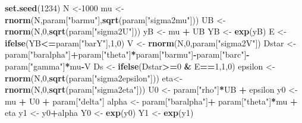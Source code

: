 \documentclass[]{book}
\newenvironment{Shaded}{\begin{snugshade}}{\end{snugshade}}
\newcommand{\DecValTok}[1]{\textcolor[rgb]{0.00,0.00,0.81}{#1}}
\newcommand{\KeywordTok}[1]{\textcolor[rgb]{0.13,0.29,0.53}{\textbf{#1}}}
\newcommand{\NormalTok}[1]{#1}
\newcommand{\OperatorTok}[1]{\textcolor[rgb]{0.81,0.36,0.00}{\textbf{#1}}}
\newcommand{\StringTok}[1]{\textcolor[rgb]{0.31,0.60,0.02}{#1}}
\theoremstyle{definition}
\theoremstyle{definition}
\theoremstyle{definition}
\theoremstyle{remark}
\begin{document}
\begin{Shaded}
\begin{Highlighting}[]
\KeywordTok{set.seed}\NormalTok{(}\DecValTok{1234}\NormalTok{)}
\NormalTok{N <-}\DecValTok{1000}
\NormalTok{mu <-}\StringTok{ }\KeywordTok{rnorm}\NormalTok{(N,param[}\StringTok{"barmu"}\NormalTok{],}\KeywordTok{sqrt}\NormalTok{(param[}\StringTok{"sigma2mu"}\NormalTok{]))}
\NormalTok{UB <-}\StringTok{ }\KeywordTok{rnorm}\NormalTok{(N,}\DecValTok{0}\NormalTok{,}\KeywordTok{sqrt}\NormalTok{(param[}\StringTok{"sigma2U"}\NormalTok{]))}
\NormalTok{yB <-}\StringTok{ }\NormalTok{mu }\OperatorTok{+}\StringTok{ }\NormalTok{UB }
\NormalTok{YB <-}\StringTok{ }\KeywordTok{exp}\NormalTok{(yB)}
\NormalTok{E <-}\StringTok{ }\KeywordTok{ifelse}\NormalTok{(YB}\OperatorTok{<=}\NormalTok{param[}\StringTok{"barY"}\NormalTok{],}\DecValTok{1}\NormalTok{,}\DecValTok{0}\NormalTok{)}
\NormalTok{V <-}\StringTok{ }\KeywordTok{rnorm}\NormalTok{(N,}\DecValTok{0}\NormalTok{,param[}\StringTok{"sigma2V"}\NormalTok{])}
\NormalTok{Dstar <-}\StringTok{ }\NormalTok{param[}\StringTok{"baralpha"}\NormalTok{]}\OperatorTok{+}\NormalTok{param[}\StringTok{"theta"}\NormalTok{]}\OperatorTok{*}\NormalTok{param[}\StringTok{"barmu"}\NormalTok{]}\OperatorTok{-}\NormalTok{param[}\StringTok{"barc"}\NormalTok{]}\OperatorTok{-}\NormalTok{param[}\StringTok{"gamma"}\NormalTok{]}\OperatorTok{*}\NormalTok{mu}\OperatorTok{-}\NormalTok{V}
\NormalTok{Ds <-}\StringTok{ }\KeywordTok{ifelse}\NormalTok{(Dstar}\OperatorTok{>=}\DecValTok{0} \OperatorTok{&}\StringTok{ }\NormalTok{E}\OperatorTok{==}\DecValTok{1}\NormalTok{,}\DecValTok{1}\NormalTok{,}\DecValTok{0}\NormalTok{)}
\NormalTok{epsilon <-}\StringTok{ }\KeywordTok{rnorm}\NormalTok{(N,}\DecValTok{0}\NormalTok{,}\KeywordTok{sqrt}\NormalTok{(param[}\StringTok{"sigma2epsilon"}\NormalTok{]))}
\NormalTok{eta<-}\StringTok{ }\KeywordTok{rnorm}\NormalTok{(N,}\DecValTok{0}\NormalTok{,}\KeywordTok{sqrt}\NormalTok{(param[}\StringTok{"sigma2eta"}\NormalTok{]))}
\NormalTok{U0 <-}\StringTok{ }\NormalTok{param[}\StringTok{"rho"}\NormalTok{]}\OperatorTok{*}\NormalTok{UB }\OperatorTok{+}\StringTok{ }\NormalTok{epsilon}
\NormalTok{y0 <-}\StringTok{ }\NormalTok{mu }\OperatorTok{+}\StringTok{  }\NormalTok{U0 }\OperatorTok{+}\StringTok{ }\NormalTok{param[}\StringTok{"delta"}\NormalTok{]}
\NormalTok{alpha <-}\StringTok{ }\NormalTok{param[}\StringTok{"baralpha"}\NormalTok{]}\OperatorTok{+}\StringTok{  }\NormalTok{param[}\StringTok{"theta"}\NormalTok{]}\OperatorTok{*}\NormalTok{mu }\OperatorTok{+}\StringTok{ }\NormalTok{eta}
\NormalTok{y1 <-}\StringTok{ }\NormalTok{y0}\OperatorTok{+}\NormalTok{alpha}
\NormalTok{Y0 <-}\StringTok{ }\KeywordTok{exp}\NormalTok{(y0)}
\NormalTok{Y1 <-}\StringTok{ }\KeywordTok{exp}\NormalTok{(y1)}
\end{Highlighting}
\end{Shaded}
\end{document}
